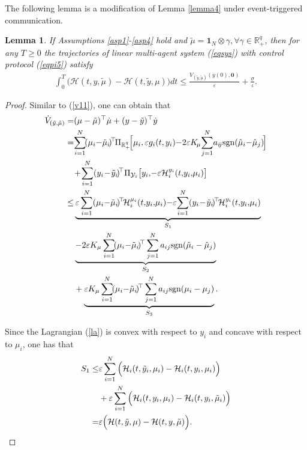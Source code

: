 \documentclass[letterpaper, 10 pt, conference]{ieeeconf}  %
\newtheorem{lemma}{ {Lemma}}
\newcommand{\sign}[1]{\mathrm{sgn}(#1)}
\begin{document}
The following lemma is a modification of Lemma \ref{lemma4} under event-triggered communication.
\begin{lemma}\label{lemma6}
	If Assumptions \ref{asp1}-\ref{asp4} hold and $\tilde{\mu}= \boldsymbol1_N \otimes \gamma, \forall \gamma\in \mathbb{R}_+^q$, then for any $T\ge0$ the trajectories of linear multi-agent system (\ref{eqsys}) with control protocol (\ref{eqpi5}) satisfy
	\begin{align}
		\int_{0}^{T} \Big(\mathcal{H}(t,y,\tilde{\mu}){-}\mathcal{H}(t,\tilde{y},\mu)\!\Big)dt{\le}\frac{V_{(\tilde{y}, \tilde{\mu})}(y(0), \boldsymbol{0})}{\varepsilon} {+} \frac{\sigma}{\iota}.
	\end{align}
\end{lemma}
\begin{proof}
	Similar to (\ref{v11}), one can obtain that
	\begin{align}
		\dot{V}_{(\tilde{y}, \tilde{\mu})}
		= 
		&(\mu-\tilde{\mu})^\top \dot{\mu} + (y-\tilde{y})^\top \dot{y}\notag\\
		=
		&\!\sum_{i=1}^{N} \!(\mu_i{-}\tilde{\mu}_i\!)\!^\top \!\Pi_{\mathbb{R}_+^q}\!\Big[\mu_i,\varepsilon g_i(t,y_i) {-}2\varepsilon K\!_\mu\! \sum_{j=1}^N \!a_{i\!j}\sign{\hat\mu_i{-}\hat\mu_j}\!\Big] \notag\\
		& \!+\! \sum_{i=1}^{N} (y_i\!-\!\tilde{y}_i\!)\!^\top \Pi_{\mathcal{Y}_i}\big[y_i, \!-\varepsilon\mathcal{H}_i^{y_i}(t,\!y_i,\!\mu_i)\big] \notag\\
		\le
		& \underbrace{\varepsilon \sum_{i=1}^{N} (\mu_i{-}\tilde{\mu}_i\!)\!^\top\! \mathcal{H}_i^{\mu_i}(t,\!y_i,\!\mu_i)
		{-}\varepsilon \!\sum_{i=1}^{N} (y_i\!-\!\tilde{y}_i\!)\!^\top\! \mathcal{H}_i^{y_i}(t,\!y_i,\!\mu_i)}_{S_{1}}\notag\\
		& \underbrace{ -2\varepsilon K_\mu \sum_{i=1}^{N} \!(\mu_i{-}\tilde{\mu}_i\!)\!^\top \sum_{j=1}^N a_{ij}\sign{\hat\mu_i-\hat\mu_j} }_{S_{2}} \notag\\
		&+ \underbrace{ \varepsilon K_\mu \sum_{i=1}^{N} \!(\mu_i{-}\tilde{\mu}_i\!)\!^\top  \sum_{j=1}^N a_{ij}\sign{\mu_i-\mu_j} }_{S_{3}}.	\label{vb1}
	\end{align}
	
	Since the Lagrangian (\ref{la}) is convex with respect to $y_i$ and concave with respect to $\mu_i$, one has that
	\begin{align}
		S_{1} \le & \varepsilon \sum_{i=1}^{N} \Big(\mathcal{H}_i (t,\tilde{y}_i,\mu_i) - \mathcal{H}_i (t,y_i,\mu_i)\Big)\notag\\  &+\varepsilon \sum_{i=1}^{N} \Big(\mathcal{H}_i(t,y_i,\mu_i) - \mathcal{H}_i(t,y_i,\tilde{\mu}_i)\Big) \notag\\
		= &\varepsilon \Big(\mathcal{H}(t,\tilde{y},\mu) - \mathcal{H}(t,y,\tilde{\mu})\Big).\label{vb2}
	\end{align}
	

\end{proof}
\end{document}
